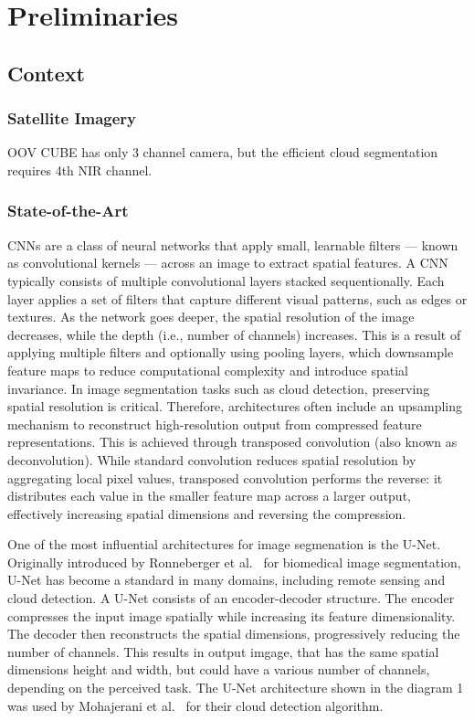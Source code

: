 {

\setlength{\parskip}{1em}

\chapter{Preliminaries}

\section{Context}
\subsection{Satellite Imagery}
OOV CUBE has only 3 channel camera, but the efficient cloud segmentation requires 4th NIR channel. 
\subsection{State-of-the-Art}

CNNs are a class of neural networks that apply small, learnable filters --- known as convolutional kernels --- across an image to extract spatial features. A CNN typically consists of multiple convolutional layers stacked sequentionally. Each layer applies a set of filters that capture different visual patterns, such as edges or textures. As the network goes deeper, the spatial resolution of the image decreases, while the depth (i.e., number of channels) increases. This is a result of applying multiple filters and optionally using pooling layers, which downsample feature maps to reduce computational complexity and introduce spatial invariance.
In image segmentation tasks such as cloud detection, preserving spatial resolution is critical. Therefore, architectures often include an upsampling mechanism to reconstruct high-resolution output from compressed feature representations. This is achieved through transposed convolution (also known as deconvolution). While standard convolution reduces spatial resolution by aggregating local pixel values, transposed convolution performs the reverse: it distributes each value in the smaller feature map across a larger output, effectively increasing spatial dimensions and reversing the compression.

One of the most influential architectures for image segmenation is the U-Net. Originally introduced by Ronneberger et al.~\cite{ronneberger2015u} for biomedical image segmentation, U-Net has become a standard in many domains, including remote sensing and cloud detection. A U-Net consists of an encoder-decoder structure. The encoder compresses the input image spatially while increasing its feature dimensionality. The decoder then reconstructs the spatial dimensions, progressively reducing the number of channels. This results in output imgage, that has the same spatial dimensions height and width, but could have a various number of channels, depending on the perceived task. The U-Net architecture shown in the diagram 1 was used by Mohajerani et al.~\cite{mohajerani2019cloudnet}  for their cloud detection algorithm.

}
